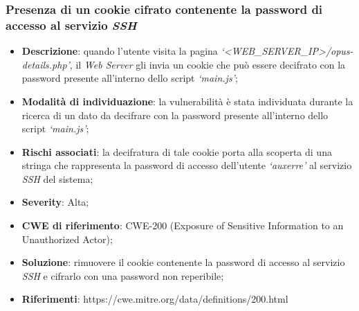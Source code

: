 \documentclass[a4paper,11pt,oneside,top=3cm,bottom=3cm,left=3.5cm,right=3.5cm,openright,reqno,table]{book}
\begin{document}
\subsubsection{Presenza di un cookie cifrato contenente la password di accesso al servizio \emph{SSH}}
\begin{itemize}
    \item \textbf{Descrizione}: quando l'utente visita la pagina \emph{`<WEB\_SERVER\_IP>/opus-details.php'}, il \emph{Web Server} gli invia un cookie che può essere decifrato con la password presente all'interno dello script \emph{`main.js'};
    \item \textbf{Modalità di individuazione}: la vulnerabilità è stata individuata durante la ricerca di un dato da decifrare con la password presente all'interno dello script \emph{`main.js'};
    \item \textbf{Rischi associati}: la decifratura di tale cookie porta alla scoperta di una stringa che rappresenta la password di accesso dell'utente \emph{`auxerre'} al servizio \emph{SSH} del sistema;
    \item \textbf{Severity}: Alta;
    \item \textbf{CWE di riferimento}: CWE-200 (Exposure of Sensitive Information to an Unauthorized Actor);
    \item \textbf{Soluzione}: rimuovere il cookie contenente la password di accesso al servizio \emph{SSH} e cifrarlo con una password non reperibile;
    \item \textbf{Riferimenti}: https://cwe.mitre.org/data/definitions/200.html
\end{itemize}
\end{document}
